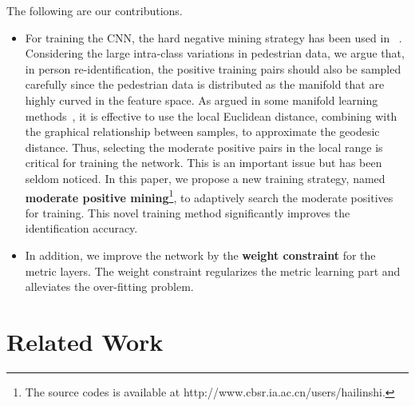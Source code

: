 \documentclass[runningheads]{llncs}
\begin{document}
The following are our contributions.
\begin{itemize}\itemsep=-1pt
    \item For training the CNN, the hard negative mining strategy has been used in ~\cite{ahmed2015improved,parkhi2015deep,schroff2015facenet}.
    Considering the large intra-class variations in pedestrian data, we argue that, in person re-identification,
    the positive training pairs should also be sampled carefully since the pedestrian data is distributed as the manifold that are highly curved in the feature space.
    As argued in some manifold learning methods~\cite{tenenbaum2000global,roweis2000nonlinear,belkin2003laplacian}, it is effective to use the local Euclidean distance, combining with the graphical relationship between samples, to approximate the geodesic distance.
    Thus, selecting the moderate positive pairs in the local range is critical for training the network.
    This is an important issue but has been seldom noticed.
    In this paper, we propose a new training strategy, named \textbf{moderate positive mining}\footnote{The source codes is available at http://www.cbsr.ia.ac.cn/users/hailinshi.
}, to adaptively search the moderate positives for training.
    This novel training method significantly improves the identification accuracy.
    \item In addition, we improve the network by the \textbf{weight constraint} for the metric layers.
    The weight constraint regularizes the metric learning part and alleviates the over-fitting problem.
\end{itemize}












\section{Related Work}
\label{section_Related_work}
\end{document}
